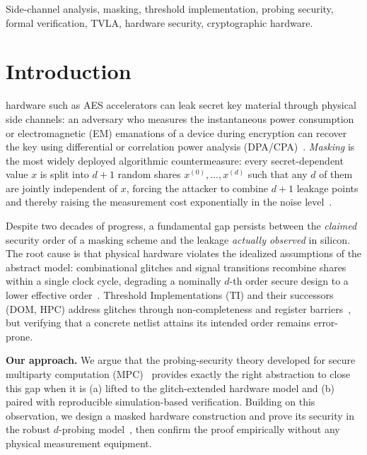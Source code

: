 \documentclass[lettersize,journal]{IEEEtran}
\newcommand{\share}[2]{#1^{(#2)}}
\begin{document}
\begin{IEEEkeywords}
Side-channel analysis, masking, threshold implementation, probing security,
formal verification, TVLA, hardware security, cryptographic hardware.
\end{IEEEkeywords}

\section{Introduction}
 hardware such as AES accelerators can leak secret
key material through physical side channels: an adversary who measures the
instantaneous power consumption or electromagnetic (EM) emanations of a device
during encryption can recover the key using differential or correlation power
analysis (DPA/CPA)~\cite{kocher1999dpa,brier2004cpa}. \emph{Masking} is the
most widely deployed algorithmic countermeasure: every secret-dependent value
$x$ is split into $d+1$ random shares $\share{x}{0},\dots,\share{x}{d}$ such
that any $d$ of them are jointly independent of $x$, forcing the attacker to
combine $d+1$ leakage points and thereby raising the measurement cost
exponentially in the noise level~\cite{ishai2003private,chari1999towards}.

Despite two decades of progress, a fundamental gap persists between the
\emph{claimed} security order of a masking scheme and the leakage \emph{actually
observed} in silicon. The root cause is that physical hardware violates the
idealized assumptions of the abstract model: combinational glitches and signal
transitions recombine shares within a single clock cycle, degrading a nominally
$d$-th order secure design to a lower effective order~\cite{mangard2005glitch,
nikova2006threshold}. Threshold Implementations (TI) and their successors
(DOM, HPC) address glitches through non-completeness and register
barriers~\cite{nikova2006threshold,gross2016dom,cassiers2020hpc}, but verifying
that a concrete netlist attains its intended order remains error-prone.

\textbf{Our approach.} We argue that the probing-security theory developed for
secure multiparty computation (MPC)~\cite{ishai2003private} provides exactly the
right abstraction to close this gap when it is (a) lifted to the
glitch-extended hardware model and (b) paired with reproducible simulation-based
verification. Building on this observation, we design a masked hardware
construction and prove its security in the robust $d$-probing
model~\cite{faust2018composable}, then confirm the proof empirically without any
physical measurement equipment.
\end{document}
